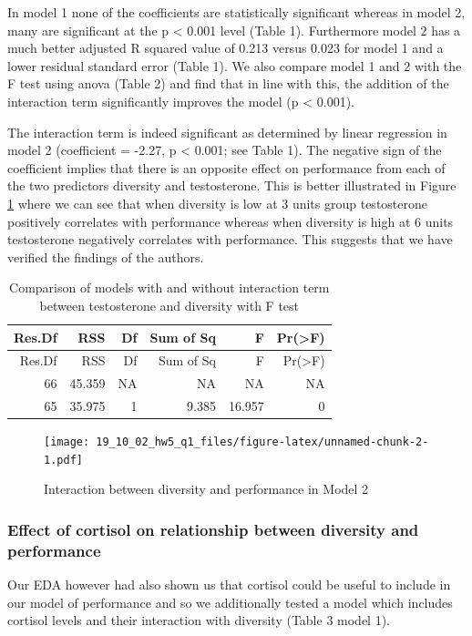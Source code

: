 \documentclass[]{article}
\begin{document}
In model 1 none of the coefficients are statistically significant
whereas in model 2, many are significant at the p \textless{} 0.001
level (Table 1). Furthermore model 2 has a much better adjusted R
squared value of 0.213 versus 0.023 for model 1 and a lower residual
standard error (Table 1). We also compare model 1 and 2 with the F test
using anova (Table 2) and find that in line with this, the addition of
the interaction term significantly improves the model (p \textless{}
0.001).

The interaction term is indeed significant as determined by linear
regression in model 2 (coefficient = -2.27, p \textless{} 0.001; see
Table 1). The negative sign of the coefficient implies that there is an
opposite effect on performance from each of the two predictors diversity
and testosterone. This is better illustrated in Figure \ref{fig:int}
where we can see that when diversity is low at 3 units group
testosterone positively correlates with performance whereas when
diversity is high at 6 units testosterone negatively correlates with
performance. This suggests that we have verified the findings of the
authors.

\begin{longtable}[]{@{}rrrrrr@{}}
\caption{Comparison of models with and without interaction term between
testosterone and diversity with F test}\tabularnewline
\toprule
Res.Df & RSS & Df & Sum of Sq & F & Pr(\textgreater{}F)\tabularnewline
\midrule
\endfirsthead
\toprule
Res.Df & RSS & Df & Sum of Sq & F & Pr(\textgreater{}F)\tabularnewline
\midrule
\endhead
66 & 45.359 & NA & NA & NA & NA\tabularnewline
65 & 35.975 & 1 & 9.385 & 16.957 & 0\tabularnewline
\bottomrule
\end{longtable}

\begin{figure}
\centering
\texttt{[image: 19\_10\_02\_hw5\_q1\_files/figure-latex/unnamed-chunk-2-1.pdf]}
\caption{\label{fig:int}Interaction between diversity and performance in
Model 2}
\end{figure}

\hypertarget{effect-of-cortisol-on-relationship-between-diversity-and-performance}{%
\subsubsection{Effect of cortisol on relationship between diversity and
performance}\label{effect-of-cortisol-on-relationship-between-diversity-and-performance}}

Our EDA however had also shown us that cortisol could be useful to
include in our model of performance and so we additionally tested a
model which includes cortisol levels and their interaction with
diversity (Table 3 model 1).
\end{document}
